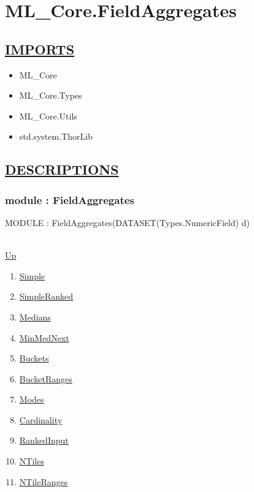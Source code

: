 \chapter*{ML\_Core.FieldAggregates}
\hypertarget{ML_Core.FieldAggregates}{}

\section*{\underline{IMPORTS}}
\begin{itemize}
\item ML\_Core
\item ML\_Core.Types
\item ML\_Core.Utils
\item std.system.ThorLib
\end{itemize}

\section*{\underline{DESCRIPTIONS}}
\subsection*{module : FieldAggregates}
\hypertarget{ecldoc:ml_core.fieldaggregates}{MODULE : FieldAggregates(DATASET(Types.NumericField) d)} \\
\hyperlink{ecldoc:}{Up} \\
\par
\begin{enumerate}
\item \hyperlink{ecldoc:ml_core.fieldaggregates.simple}{Simple}
\item \hyperlink{ecldoc:ml_core.fieldaggregates.simpleranked}{SimpleRanked}
\item \hyperlink{ecldoc:ml_core.fieldaggregates.medians}{Medians}
\item \hyperlink{ecldoc:ml_core.fieldaggregates.minmednext}{MinMedNext}
\item \hyperlink{ecldoc:ml_core.fieldaggregates.buckets}{Buckets}
\item \hyperlink{ecldoc:ml_core.fieldaggregates.bucketranges}{BucketRanges}
\item \hyperlink{ecldoc:ml_core.fieldaggregates.modes}{Modes}
\item \hyperlink{ecldoc:ml_core.fieldaggregates.cardinality}{Cardinality}
\item \hyperlink{ecldoc:ml_core.fieldaggregates.rankedinput}{RankedInput}
\item \hyperlink{ecldoc:ml_core.fieldaggregates.ntiles}{NTiles}
\item \hyperlink{ecldoc:ml_core.fieldaggregates.ntileranges}{NTileRanges}
\end{enumerate}

